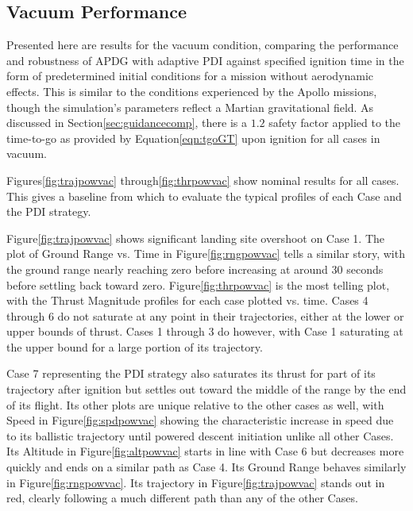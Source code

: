 \subsection{Vacuum Performance} \label{sec:vacperf}

Presented here are results for the vacuum condition, comparing the performance and robustness of APDG with adaptive PDI against specified ignition time in the form of predetermined initial conditions for a mission without aerodynamic effects. This is similar to the conditions experienced by the Apollo missions, though the simulation's parameters reflect a Martian gravitational field. As discussed in Section\:\ref{sec:guidancecomp}, there is a $1.2$ safety factor applied to the time-to-go as provided by Equation\:\ref{eqn:tgoGT} upon ignition for all cases in vacuum.

Figures\:\ref{fig:trajpowvac} through\:\ref{fig:thrpowvac} show nominal results for all cases. This gives a baseline from which to evaluate the typical profiles of each Case and the PDI strategy. 

Figure\:\ref{fig:trajpowvac} shows significant landing site overshoot on Case 1. The plot of Ground Range vs. Time in Figure\:\ref{fig:rngpowvac} tells a similar story, with the ground range nearly reaching zero before increasing at around 30 seconds before settling back toward zero. Figure\:\ref{fig:thrpowvac} is the most telling plot, with the Thrust Magnitude profiles for each case plotted vs. time. Cases 4 through 6 do not saturate at any point in their trajectories, either at the lower or upper bounds of thrust. Cases 1 through 3 do however, with Case 1 saturating at the upper bound for a large portion of its trajectory. 

Case 7 representing the PDI strategy also saturates its thrust for part of its trajectory after ignition but settles out toward the middle of the range by the end of its flight. Its other plots are unique relative to the other cases as well, with Speed in Figure\:\ref{fig:spdpowvac} showing the characteristic increase in speed due to its ballistic trajectory until powered descent initiation unlike all other Cases. Its Altitude in Figure\:\ref{fig:altpowvac} starts in line with Case 6 but decreases more quickly and ends on a similar path as Case 4. Its Ground Range behaves similarly in Figure\:\ref{fig:rngpowvac}. Its trajectory in Figure\:\ref{fig:trajpowvac} stands out in red, clearly following a much different path than any of the other Cases.

